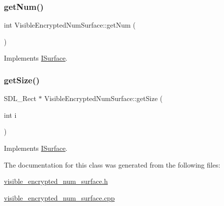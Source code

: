 \subsubsection{\texorpdfstring{get\+Num()}{getNum()}}
{\footnotesize\ttfamily int Visible\+Encrypted\+Num\+Surface\+::get\+Num (\begin{DoxyParamCaption}{ }\end{DoxyParamCaption})\hspace{0.3cm}{\ttfamily [virtual]}}



Implements \mbox{\hyperlink{class_i_surface_a1553f92deac310771e6fe63d62fc1d95}{I\+Surface}}.

\mbox{\label{class_visible_encrypted_num_surface_a1630bfa672150174ab134821f50f9ee5}} 
\subsubsection{\texorpdfstring{get\+Size()}{getSize()}}
{\footnotesize\ttfamily S\+D\+L\+\_\+\+Rect $\ast$ Visible\+Encrypted\+Num\+Surface\+::get\+Size (\begin{DoxyParamCaption}\item[{int}]{i }\end{DoxyParamCaption})\hspace{0.3cm}{\ttfamily [virtual]}}



Implements \mbox{\hyperlink{class_i_surface_ae0b5040cd0eaa1897f61f994f7b2eacf}{I\+Surface}}.



The documentation for this class was generated from the following files\+:\begin{DoxyCompactItemize}
\item 
\mbox{\hyperlink{visible__encrypted__num__surface_8h}{visible\+\_\+encrypted\+\_\+num\+\_\+surface.\+h}}\item 
\mbox{\hyperlink{visible__encrypted__num__surface_8cpp}{visible\+\_\+encrypted\+\_\+num\+\_\+surface.\+cpp}}\end{DoxyCompactItemize}
